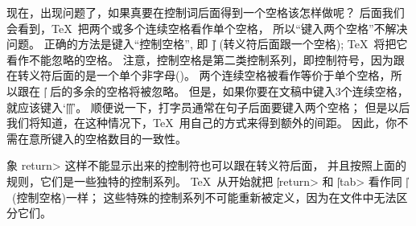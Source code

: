 现在，出现问题了，如果真要在控制词后面得到一个空格该怎样做呢？
后面我们会看到，\TeX\ 把两个或多个连续空格看作单个空格，
所以``键入两个空格''不解决问题。
正确的方法是键入``控制空格'', 即
\begintt
\|]
\endtt
(转义符后面跟一个空格);
\TeX\ 将把它看作不能忽略的空格。%
注意，控制空格是第二类控制系列，即控制符号，因为跟在转义符后面的是一个单个非字母(\])。%
两个连续空格被看作等价于单个空格，所以跟在 |\|\] 后的多余的空格将被忽略。%
但是，如果你要在文稿中键入3个连续空格，就应该键入`|\|\]|\|\]|\|\]'。%
顺便说一下，打字员通常在句子后面要键入两个空格；
但是以后我们将知道，在这种情况下，\TeX\ 用自己的方式来得到额外的间距。
因此，你不需在意所键入的空格数目的一致性。

\danger 象 \<return> 这样不能显示出来的控制符也可以跟在转义符后面，
并且按照上面的规则，它们是一些独特的控制系列。%
\TeX\ 从开始就把 |\|\<return> 和 |\|\<tab> 看作同 |\|\]~(控制空格)一样；
这些特殊的控制系列不可能重新被定义，因为在文件中无法区分它们。

